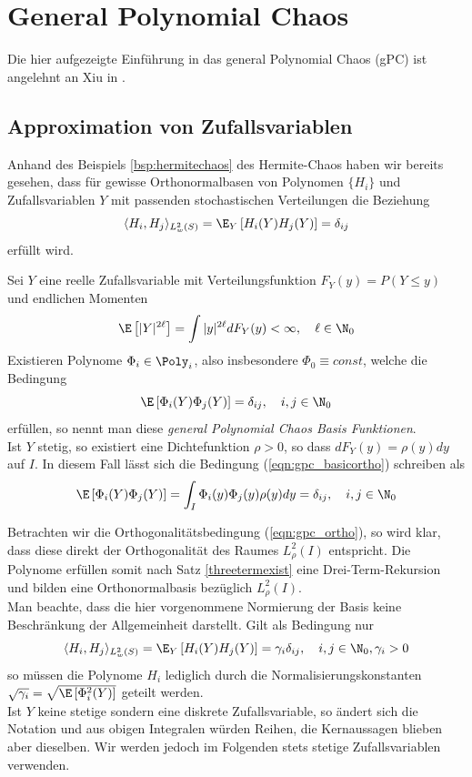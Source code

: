 
\chapter{General Polynomial Chaos}
Die hier aufgezeigte Einführung in das general Polynomial Chaos (gPC) ist angelehnt an Xiu in \autocite{dongbinxiu2010}.
\section{Approximation von Zufallsvariablen}
Anhand des Beispiels \ref{bsp:hermitechaos} des Hermite-Chaos haben wir bereits gesehen, dass für gewisse Orthonormalbasen von Polynomen $\lbrace H_i\rbrace$ und Zufallsvariablen $Y$ mit passenden stochastischen Verteilungen die Beziehung
\[\langle H_i,H_j\rangle_{L_w^2(S)} =\E_Y \left[H_i(Y)H_j(Y)\right]=\delta_{ij}\]
erfüllt wird.
\begin{mathdef}
\label{def:gpc}
Sei $Y$ eine reelle Zufallsvariable mit Verteilungsfunktion $F_Y(y)=P(Y\le y)$ und endlichen Momenten
\[\E\left[|Y|^{2\ell}\right]=\int |y|^{2\ell}dF_Y(y)<\infty,\quad \ell\in \N_0\]
Existieren Polynome $\Phi_i\in\Poly_i$, also insbesondere $\Phi_0\equiv const$, welche die Bedingung
\begin{equation}
\label{eqn:gpc_basicortho}
\E\left[\Phi_i(Y)\Phi_j(Y)\right]=\delta_{ij},\quad i,j\in\N_0
\end{equation}
erfüllen, so nennt man diese \emph{general Polynomial Chaos Basis Funktionen}.\\
Ist $Y$ stetig, so existiert eine Dichtefunktion $\rho>0$, so dass $dF_Y(y)=\rho(y)dy$ auf $I$. In diesem Fall lässt sich die Bedingung (\ref{eqn:gpc_basicortho}) schreiben als
\begin{equation}
\label{eqn:gpc_ortho}
\E\left[\Phi_i(Y)\Phi_j(Y)\right]=\int_I \Phi_i(y)\Phi_j(y)\rho(y)dy=\delta_{ij},\quad i,j\in\N_0
\end{equation}
\end{mathdef}
\begin{mathbem}
Betrachten wir die Orthogonalitätsbedingung (\ref{eqn:gpc_ortho}), so wird klar, dass diese direkt der Orthogonalität des Raumes $L_\rho^2(I)$ entspricht. Die Polynome erfüllen somit nach Satz \ref{threetermexist} eine Drei-Term-Rekursion und bilden eine Orthonormalbasis bezüglich $L_\rho^2(I)$.\\
Man beachte, dass die hier vorgenommene Normierung der Basis keine Beschränkung der Allgemeinheit darstellt. Gilt als Bedingung nur
\[\langle H_i,H_j\rangle_{L_w^2(S)} =\E_Y \left[H_i(Y)H_j(Y)\right]=\gamma_i\delta_{ij},\quad i,j\in\N_0,\gamma_i>0\]
so müssen die Polynome $H_i$ lediglich durch die Normalisierungskonstanten $\sqrt{\gamma_i}=\sqrt{\E\left[\Phi_i^2(Y)\right]}$ geteilt werden.\\
Ist $Y$ keine stetige sondern eine diskrete Zufallsvariable, so ändert sich die Notation und aus obigen Integralen würden Reihen, die Kernaussagen blieben aber dieselben. Wir werden jedoch im Folgenden stets stetige Zufallsvariablen verwenden.
\end{mathbem}
